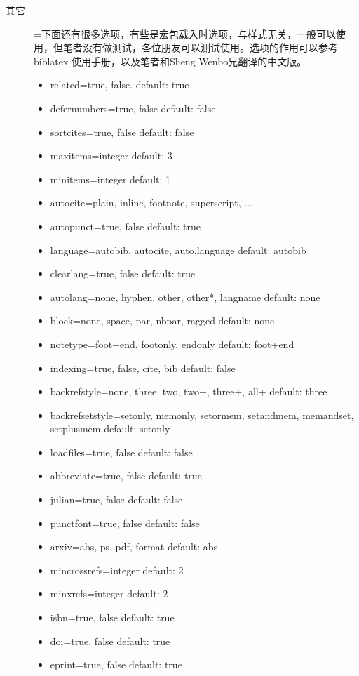 \begin{description}
  \item[其它]=下面还有很多选项，有些是宏包载入时选项，与样式无关，一般可以使用，但笔者没有做测试，各位朋友可以测试使用。选项的作用可以参考biblatex 使用手册，以及笔者和Sheng Wenbo兄翻译的中文版。
      \begin{itemize}
          \item related=true, false. default: true
          \item defernumbers=true, false default: false
          \item sortcites=true, false default: false
          \item maxitems=integer default: 3
          \item minitems=integer default: 1
          \item autocite=plain, inline, footnote, superscript, ...
          \item autopunct=true, false default: true
          \item language=autobib, autocite, auto,language default: autobib
          \item clearlang=true, false default: true
          \item autolang=none, hyphen, other, other*, langname default: none
          \item block=none, space, par, nbpar, ragged default: none
          \item notetype=foot+end, footonly, endonly default: foot+end
          \item indexing=true, false, cite, bib default: false
          \item backrefstyle=none, three, two, two+, three+, all+ default: three
          \item backrefsetstyle=setonly, memonly, setormem, setandmem, memandset, setplusmem default: setonly
          \item loadfiles=true, false default: false
          \item abbreviate=true, false default: true
          \item julian=true, false default: false
          \item punctfont=true, false default: false
          \item arxiv=abs, ps, pdf, format default: abs
          \item mincrossrefs=integer default: 2
          \item minxrefs=integer default: 2
          \item isbn=true, false default: true
          \item doi=true, false default: true
          \item eprint=true, false default: true
      \end{itemize}

\end{description}


